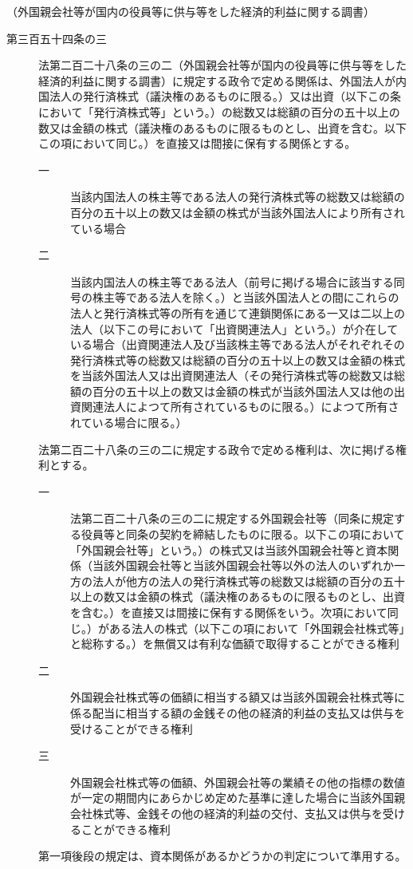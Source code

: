 \documentclass[twocolumn,a4j,10pt]{ltjtarticle}
\begin{document}
\noindent\hspace{10pt}（外国親会社等が国内の役員等に供与等をした経済的利益に関する調書）
\begin{description}
\item[第三百五十四条の三]法第二百二十八条の三の二（外国親会社等が国内の役員等に供与等をした経済的利益に関する調書）に規定する政令で定める関係は、外国法人が内国法人の発行済株式（議決権のあるものに限る。）又は出資（以下この条において「発行済株式等」という。）の総数又は総額の百分の五十以上の数又は金額の株式（議決権のあるものに限るものとし、出資を含む。以下この項において同じ。）を直接又は間接に保有する関係とする。
\begin{description}
\item[一]当該内国法人の株主等である法人の発行済株式等の総数又は総額の百分の五十以上の数又は金額の株式が当該外国法人により所有されている場合
\item[二]当該内国法人の株主等である法人（前号に掲げる場合に該当する同号の株主等である法人を除く。）と当該外国法人との間にこれらの法人と発行済株式等の所有を通じて連鎖関係にある一又は二以上の法人（以下この号において「出資関連法人」という。）が介在している場合（出資関連法人及び当該株主等である法人がそれぞれその発行済株式等の総数又は総額の百分の五十以上の数又は金額の株式を当該外国法人又は出資関連法人（その発行済株式等の総数又は総額の百分の五十以上の数又は金額の株式が当該外国法人又は他の出資関連法人によつて所有されているものに限る。）によつて所有されている場合に限る。）
\end{description}
\item[]法第二百二十八条の三の二に規定する政令で定める権利は、次に掲げる権利とする。
\begin{description}
\item[一]法第二百二十八条の三の二に規定する外国親会社等（同条に規定する役員等と同条の契約を締結したものに限る。以下この項において「外国親会社等」という。）の株式又は当該外国親会社等と資本関係（当該外国親会社等と当該外国親会社等以外の法人のいずれか一方の法人が他方の法人の発行済株式等の総数又は総額の百分の五十以上の数又は金額の株式（議決権のあるものに限るものとし、出資を含む。）を直接又は間接に保有する関係をいう。次項において同じ。）がある法人の株式（以下この項において「外国親会社株式等」と総称する。）を無償又は有利な価額で取得することができる権利
\item[二]外国親会社株式等の価額に相当する額又は当該外国親会社株式等に係る配当に相当する額の金銭その他の経済的利益の支払又は供与を受けることができる権利
\item[三]外国親会社株式等の価額、外国親会社等の業績その他の指標の数値が一定の期間内にあらかじめ定めた基準に達した場合に当該外国親会社株式等、金銭その他の経済的利益の交付、支払又は供与を受けることができる権利
\end{description}
\item[]第一項後段の規定は、資本関係があるかどうかの判定について準用する。
\end{description}
\end{document}

